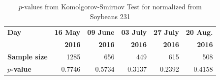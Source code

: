 \documentclass[journal]{IEEEtran}
\begin{document}
\begin{table}[hbt]
  \centering
  \caption{$p$-values from Komolgorov-Smirnov Test for normalized from Soybeans 231}
  \label{tab:pvalues_alpha_sb231}
  \begin{tabular}{lrrrrr}
    \toprule
    \textbf{Day} & \textbf{16 May} & \textbf{09 June} & \textbf{03 July} & \textbf{27 July} & \textbf{20 Aug.}\\ 
                 & \textbf{2016} & \textbf{2016} & \textbf{2016} & \textbf{2016} & \textbf{2016}\\\midrule
    \textbf{Sample size} & 1285 & 656 & 449 & 615 & 508\\
    \textbf{$p$-value} & 0.7746 & 0.5734 & 0.3137 & 0.2392 & 0.4158\\
    \bottomrule
  \end{tabular}
\end{table}
\end{document}
